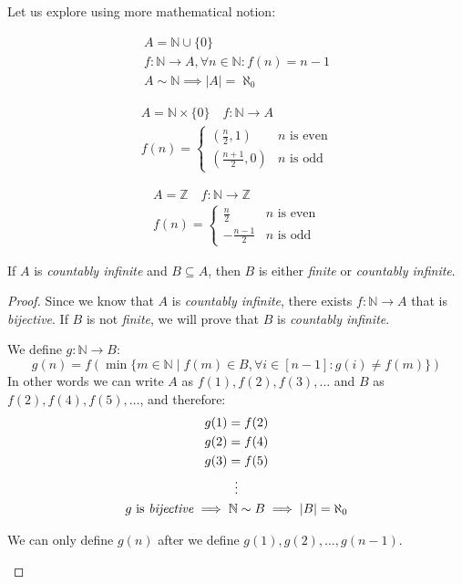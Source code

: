 \documentclass[00_complete]{subfiles}
\begin{document}
Let us explore using more mathematical notion:
\begin{example}
    \begin{gather*}
        A=\mathbb{N}\cup \{0\} \\
        f:\mathbb{N}\to A, \forall n \in \mathbb{N}: f(n)=n-1 \\
        A \sim \mathbb{N} \implies |A|=\aleph_0
    \end{gather*}
\end{example}
\begin{example}
    \begin{gather*}
        A=\mathbb{N}\times\{0\} \quad f:\mathbb{N} \to A\\
        f(n) = \begin{cases}
            (\frac{n}{2},1) & \text{$n$ is even} \\
            (\frac{n+1}{2},0) & \text{$n$ is odd}
        \end{cases}
    \end{gather*}
\end{example}
\begin{example}
    \begin{gather*}
        A=\mathbb{Z} \quad f:\mathbb{N}\to\mathbb{Z} \\
        f(n) = \begin{cases}
            \frac{n}{2} & \text{$n$ is even} \\
            -\frac{n-1}{2} & \text{$n$ is odd}
        \end{cases}
    \end{gather*}
\end{example}
\begin{claim}
    If $A$ is \emph{countably infinite} and $B \subseteq A$, then $B$
    is either \emph{finite} or \emph{countably infinite}.
\end{claim}
\begin{proof}
    Since we know that $A$ is \emph{countably infinite}, there exists
    $f:\mathbb{N}\to A$ that is \emph{bijective}. If $B$ is not \emph{finite},
    we will prove that $B$ is \emph{countably infinite}.

    We define $g:\mathbb{N}\to B$:
    $$g(n)=f(\min\{m\in\mathbb{N} \mid f(m) \in B, \forall i\in [n-1]: g(i)\neq
    f(m)\})$$
    In other words we can write $A$ as $f(1),f(2),f(3),\dots$ and $B$ as
    $f(2),f(4),f(5),\dots$, and therefore:
    \begin{gather*}
        g(1)=f(2) \\ g(2)=f(4) \\ g(3)=f(5) \\ \vdots \\
        g \text{ is \emph{bijective}} \implies \mathbb{N} \sim B \implies
        |B|=\aleph_0
    \end{gather*}
\begin{note}
    We can only define $g(n)$ after we define $g(1),g(2),\dots,g(n-1)$.
\end{note}
\end{proof}
\end{document}
